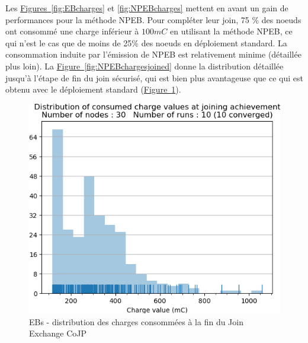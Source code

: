 \documentclass[]{report}
\newcommand{\wordlink}[2]{\hyperref[#2]{#1~\ref{#2}}}
\begin{document}
\vspace{0.2cm}


Les \wordlink{Figures}{fig:EBcharges} et \ref{fig:NPEBcharges} mettent en avant un gain de performances pour la méthode NPEB. Pour compléter leur join, 75 \% des noeuds ont consommé une charge inférieur à $100 mC$ en utilisant la méthode NPEB, ce qui n'est le cas que de moins de 25\% des noeuds en déploiement standard. La consommation induite par l'émission de NPEB est relativement minime (détaillée plus loin). La \wordlink{Figure}{fig:NPEBchargesjoined} donne la distribution détaillée jusqu'à l'étape de fin du join sécurisé, qui est bien plus avantageuse que ce qui est obtenu avec le déploiement standard (\wordlink{Figure}{fig:EBchargesjoined}).

\newpage

\begin{figure}[!ht]
	\begin{minipage}{0.49\textwidth}
		\centering
		\includegraphics[width=\textwidth]{results/EB/chargejoined.hist}
		\caption{EBs - distribution des charges consommées à la fin du Join Exchange CoJP}
		\label{fig:EBchargesjoined}
	\end{minipage}\hfill
	\begin{minipage}{0.5\textwidth}
		\centering

\end{minipage}
\end{figure}
\end{document}
